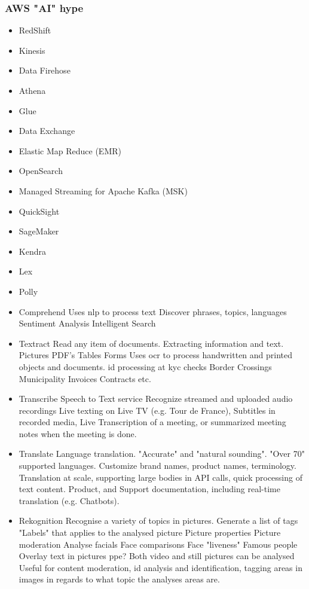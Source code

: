 \subsubsection{AWS "AI" hype}

\begin{itemize}
    \item RedShift
    \item Kinesis
    \item Data Firehose
    \item Athena
    \item Glue
    \item Data Exchange
    \item Elastic Map Reduce (EMR)
    \item OpenSearch
    \item Managed Streaming for Apache Kafka (MSK)
    \item QuickSight
    \item SageMaker
    \item Kendra
    \item Lex
    \item Polly
    \item Comprehend
    \subitem Uses \gls{nlp} to process text
    \subitem Discover phrases, topics, languages
    \subitem Sentiment Analysis
    \subitem Intelligent Search
    \item Textract
    \subitem Read any item of documents. Extracting information and text.
    \subsubitem Pictures
    \subsubitem PDF's
    \subsubitem Tables
    \subsubitem Forms
    \subitem Uses \gls{ocr} to process handwritten and printed objects and documents.
    \subsubitem \gls{id} processing at \gls{kyc} checks
    \subsubitem Border Crossings
    \subsubitem Municipality
    \subsubitem Invoices
    \subsubitem Contracts
    \subsubitem etc.
    \item Transcribe
    \subitem Speech to Text service
    \subitem Recognize streamed and uploaded audio recordings
    \subitem Live texting on Live TV (e.g. Tour de France), Subtitles in recorded media, Live Transcription of a meeting, or summarized meeting notes when the meeting is done.
    \item Translate
    \subitem Language translation. "Accurate" and "natural sounding".
    \subitem "Over 70" supported languages. Customize brand names, product names, terminology.
    \subitem Translation at scale, supporting large bodies in API calls, quick processing of text content.
    \subitem Product, and Support documentation, including real-time translation (e.g. Chatbots).
    \item Rekognition
    \subitem Recognise a variety of topics in pictures.
    \subsubitem Generate a list of tags "Labels" that applies to the analysed picture
    \subsubitem Picture properties
    \subsubitem Picture moderation
    \subsubitem Analyse facials
    \subsubitem Face comparisons
    \subsubitem Face "liveness"
    \subsubitem Famous people
    \subsubitem Overlay text in pictures
    \subsubitem ppe?
    \subitem Both video and still pictures can be analysed
    \subitem Useful for content moderation, \gls{id} analysis and identification, tagging areas in images in regards to what topic the analyses areas are.
\end{itemize}
